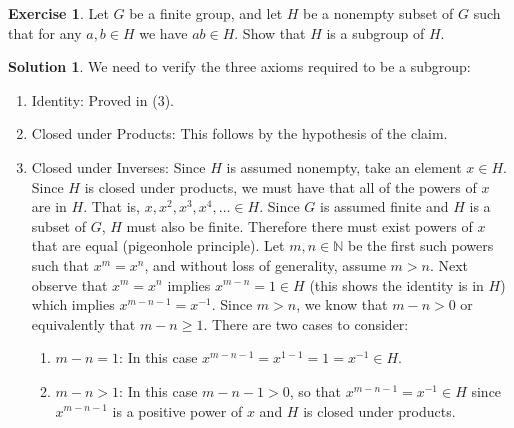 \documentclass[12pt]{article}
\theoremstyle{definition}
\newtheorem{exercise}{\color{YellowOrange}Exercise}
\theoremstyle{definition}
\newtheorem{solution}{\color{Goldenrod}Solution}
\begin{document}
\begin{exercise}
Let $G$ be a finite group, and let $H$ be a nonempty subset of $G$ such that for any $a,b \in H$ we have $ab \in H$. Show that $H$ is a subgroup of $H$. 
\end{exercise}		
\begin{solution}
We need to verify the three axioms required to be a subgroup:
\begin{enumerate}
	\item Identity: Proved in (3).
	\item Closed under Products: This follows by the hypothesis of the claim.
	\item Closed under Inverses: Since $H$ is assumed nonempty, take an element $x \in H$. Since $H$ is closed under products, we must have that all of the powers of $x$ are in $H$. That is, $x, x^2, x^3, x^4, \ldots \in H$. Since $G$ is assumed finite and $H$ is a subset of $G$, $H$ must also be finite. Therefore there must exist powers of $x$ that are equal (pigeonhole principle). Let $m,n \in \mathbb{N}$ be the first such powers such that $x^m = x^n$, and without loss of generality, assume $m > n$. Next observe that $x^m = x^n$ implies $x^{m-n} = 1 \in H$ (this shows the identity is in $H$) which implies $x^{m-n-1} = x^{-1}$. Since  $m > n$, we know that $m -n >0$ or equivalently that $m -n \geq 1$. There are two cases to consider:
	\begin{enumerate}
		\item $m-n = 1$: In this case $x^{m-n-1} = x^{1-1} = 1 = x^{-1} \in H$. 
		\item $m - n > 1$: In this case $m - n - 1 > 0$, so that $x^{m-n-1} = x^{-1} \in H$ since $x^{m-n-1}$ is a positive power of $x$ and $H$ is closed under products. 
	\end{enumerate}
\end{enumerate}
\end{solution}
\end{document}
